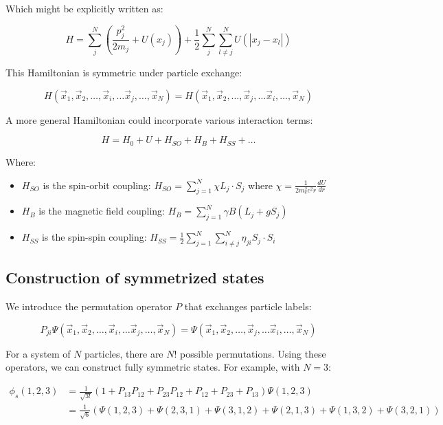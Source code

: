 \documentclass[italian]{HKNdocument}
\begin{document}
Which might be explicitly written as:

\begin{equation}
H=\sum_{j}^{N}(\frac{p_j^2}{2m_j}+U(x_j))+\frac{1}{2}\sum_{j}^{N}\sum_{l\neq j}^{N}U(|x_j-x_l|) \label{eq:14.2}
\end{equation}

This Hamiltonian is symmetric under particle exchange:

\begin{equation}
H(\vec{x}_1,\vec{x}_2,\ldots,\vec{x}_i,\ldots\vec{x}_j,\ldots,\vec{x}_N)=H(\vec{x}_1,\vec{x}_2,\ldots,\vec{x}_j,\ldots\vec{x}_i,\ldots,\vec{x}_N) \label{eq:14.3}
\end{equation}


A more general Hamiltonian could incorporate various interaction terms:

\begin{equation}
H=H_0+U+H_{SO}+H_B+H_{SS}+\ldots \label{eq:14.4}
\end{equation}

Where:
\begin{itemize}
  \item $H_{SO}$ is the spin-orbit coupling: $H_{SO}=\sum_{j=1}^{N}\chi L_j\cdot S_j$ where $\chi=\frac{1}{2m_e^2c^2r}\frac{dU}{dr}$
  \item $H_B$ is the magnetic field coupling: $H_B=\sum_{j=1}^{N}\gamma B(L_j+gS_j)$
  \item $H_{SS}$ is the spin-spin coupling: $H_{SS}=\frac{1}{2}\sum_{j=1}^{N}\sum_{i\neq j}^{N}\eta_{ji}S_j\cdot S_i$
\end{itemize}

\subsection{Construction of symmetrized states}
We introduce the permutation operator $P$ that exchanges particle labels:

\begin{equation}
P_{ji}\Psi(\vec{x}_1,\vec{x}_2,\ldots,\vec{x}_i,\ldots\vec{x}_j,\ldots,\vec{x}_N)=\Psi(\vec{x}_1,\vec{x}_2,\ldots,\vec{x}_j,\ldots\vec{x}_i,\ldots,\vec{x}_N) \label{eq:14.5}
\end{equation}

For a system of $N$ particles, there are $N!$ possible permutations. Using these operators, we can construct fully symmetric states. For example, with $N=3$:

\begin{align}
\phi_s(1,2,3)&=\frac{1}{\sqrt{3!}}(1+P_{13}P_{12}+P_{23}P_{12}+P_{12}+P_{23}+P_{13})\Psi(1,2,3)\\
&=\frac{1}{\sqrt{6}}(\Psi(1,2,3)+\Psi(2,3,1)+\Psi(3,1,2)+\Psi(2,1,3)+\Psi(1,3,2)+\Psi(3,2,1)) \label{eq:14.6}
\end{align}
\end{document}
